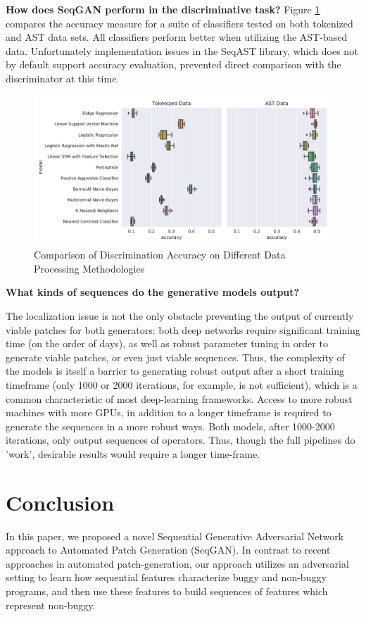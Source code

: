 \documentclass[sigconf]{acmart}
\begin{document}
\textbf{How does SeqGAN perform in the discriminative task?}
Figure \ref{fig:disc_acc} compares the accuracy measure for a suite of classifiers tested on both tokenized and AST data sets. All classifiers perform better when utilizing the AST-based data. Unfortunately implementation issues in the SeqAST library, which does not by default support accuracy evaluation, prevented direct comparison with the discriminator at this time.  
\begin{figure}
\includegraphics[width=\columnwidth]{all_clfs}
\caption{Comparison of Discrimination Accuracy on Different Data Processing Methodologies}
\label{fig:disc_acc}
\end{figure}

\textbf{What kinds of sequences do the generative models output?}

The localization issue is not the only obstacle preventing the output of currently viable patches for both generators: both deep networks require significant training time (on the order of days), as well as robust parameter tuning in order to generate viable patches, or even just viable sequences. Thus, the complexity of the models is itself a barrier to generating robust output after a short training timeframe (only 1000 or 2000 iterations, for example, is not sufficient), which is a common characteristic of most deep-learning frameworks. Access to more robust machines with more GPUs, in addition to a longer timeframe is required to generate the sequences in a more robust ways. Both models, after 1000-2000 iterations, only output sequences of operators. Thus, though the full pipelines do 'work', desirable results would require a longer time-frame.

\section{Conclusion}
\label{sec:conclusion}
In this paper, we proposed a novel Sequential Generative Adversarial Network approach to Automated Patch Generation (SeqGAN). In contrast to recent approaches in automated patch-generation, our approach utilizes an adversarial setting to learn how sequential features characterize buggy and non-buggy programs, and then use these features to build sequences of features which represent non-buggy. 
\end{document}
